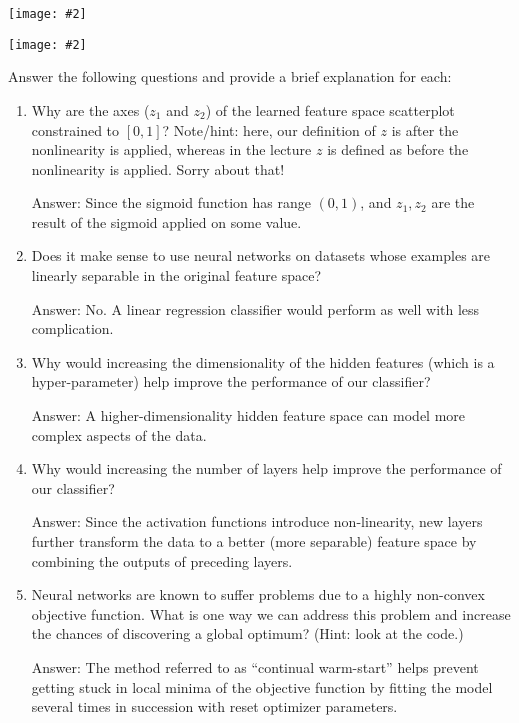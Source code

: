 \documentclass{article}
\newcommand{\blu}[1]{{\textcolor{blu}{#1}}}
\newenvironment{answer}{\par\begingroup\color{gre}Answer: }{\endgroup}
\let\ask\blu
\newcommand{\centerfig}[2]{\begin{center}\texttt{[image: \#2]}\end{center}}
\begin{document}
\centerfig{.7}{./figs/sinusoids_decision_boundary_[2, 2]_2.png}
\centerfig{.7}{./figs/sinusoids_linear_boundary_[2, 2]_2.png}

\ask{Answer the following questions and provide a brief explanation for each:}

\begin{enumerate}
    \item Why are the axes ($z_1$ and $z_2$) of the learned feature space scatterplot constrained to $[0, 1]$? Note/hint: here, our definition of $z$ is after the nonlinearity is applied, whereas in the lecture $z$ is defined as before the nonlinearity is applied. Sorry about that!
    \begin{answer}
        Since the sigmoid function has range $(0, 1)$, and $z_1, z_2$ are the result of the sigmoid applied on some value.
    \end{answer}

    \item Does it make sense to use neural networks on datasets whose examples are linearly separable in the original feature space?
    \begin{answer}
        No. A linear regression classifier would perform as well with less complication.
    \end{answer}

    \item Why would increasing the dimensionality of the hidden features (which is a hyper-parameter) help improve the performance of our classifier?
    \begin{answer}
        A higher-dimensionality hidden feature space can model more complex aspects of the data.
    \end{answer}

    \item Why would increasing the number of layers help improve the performance of our classifier?
    \begin{answer}
        Since the activation functions introduce non-linearity, new layers further transform the data to a better (more separable) feature space by combining the outputs of preceding layers.
    \end{answer}

    \item Neural networks are known to suffer problems due to a highly non-convex objective function. What is one way we can address this problem and increase the chances of discovering a global optimum? (Hint: look at the code.)
    \begin{answer}
        The method referred to as ``continual warm-start'' helps prevent getting stuck in local minima of the objective function by fitting the model several times in succession with reset optimizer parameters.
    \end{answer}
\end{enumerate}
\end{document}
